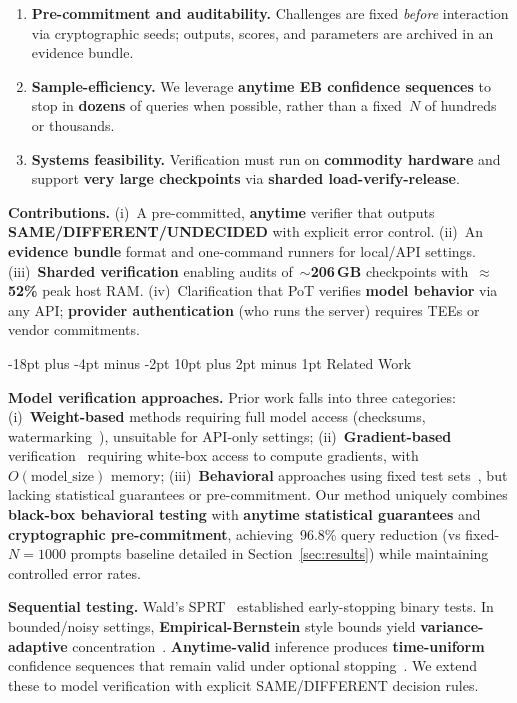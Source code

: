 \documentclass[11pt]{article}
\makeatletter
\renewcommand\section{\@startsection{section}{1}{\z@}%
  {-18pt plus -4pt minus -2pt}%
  {10pt plus 2pt minus 1pt}%
  {\normalfont\Large\bfseries}}
\makeatother
\begin{document}
\begin{enumerate}
\item \textbf{Pre-commitment and auditability.} Challenges are fixed \emph{before} interaction via cryptographic seeds; outputs, scores, and parameters are archived in an evidence bundle.
\item \textbf{Sample-efficiency.} We leverage \textbf{anytime EB confidence sequences} to stop in \textbf{dozens} of queries when possible, rather than a fixed~$N$ of hundreds or thousands.
\item \textbf{Systems feasibility.} Verification must run on \textbf{commodity hardware} and support \textbf{very large checkpoints} via \textbf{sharded load-verify-release}.
\end{enumerate}

\textbf{Contributions.} (i)~A pre-committed, \textbf{anytime} verifier that outputs \textbf{SAME/DIFFERENT/UNDECIDED} with explicit error control. (ii)~An \textbf{evidence bundle} format and one-command runners for local/API settings. (iii)~\textbf{Sharded verification} enabling audits of~${\sim}$\textbf{206\,GB} checkpoints with~${\approx}$\textbf{52\%} peak host RAM\@. (iv)~Clarification that PoT verifies \textbf{model behavior} via any API; \textbf{provider authentication} (who runs the server) requires TEEs or vendor commitments.

\section{Related Work}

\textbf{Model verification approaches.} Prior work falls into three categories: (i)~\textbf{Weight-based} methods requiring full model access (checksums, watermarking~\cite{uchida2017embedding,zhang2018protecting}), unsuitable for API-only settings; (ii)~\textbf{Gradient-based} verification~\cite{jia2021proof} requiring white-box access to compute gradients, with~$O(\mathrm{model\_size})$ memory; (iii)~\textbf{Behavioral} approaches using fixed test sets~\cite{geirhos2020shortcut,hendrycks2021many}, but lacking statistical guarantees or pre-commitment. Our method uniquely combines \textbf{black-box behavioral testing} with \textbf{anytime statistical guarantees} and \textbf{cryptographic pre-commitment}, achieving~96.8\% query reduction (vs fixed-$N = 1000$ prompts baseline detailed in Section~\ref{sec:results}) while maintaining controlled error rates.

\textbf{Sequential testing.} Wald's SPRT~\cite{wald1945sprt} established early-stopping binary tests. In bounded/noisy settings, \textbf{Empirical-Bernstein} style bounds yield \textbf{variance-adaptive} concentration~\cite{maurer2009empiricalbernstein,audibert2009exploration}. \textbf{Anytime-valid} inference produces \textbf{time-uniform} confidence sequences that remain valid under optional stopping~\cite{howard2021timeuniform,howard2021confidenceSequences}. We extend these to model verification with explicit SAME/DIFFERENT decision rules.
\end{document}
